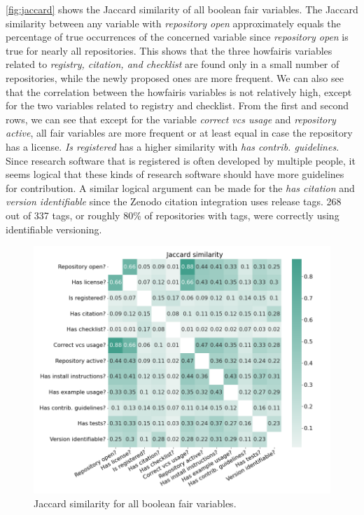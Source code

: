 \autoref{fig:jaccard} shows the Jaccard similarity of all boolean \acrshort{fair} variables. The Jaccard similarity between any variable with \textit{repository open} approximately equals the percentage of true occurrences of the concerned variable since \textit{repository open} is true for nearly all repositories. This shows that the three howfairis variables related to \textit{registry, citation, and checklist} are found only in a small number of repositories, while the newly proposed ones are more frequent. We can also see that the correlation between the howfairis variables is not relatively high, except for the two variables related to registry and checklist.
From the first and second rows, we can see that except for the variable \textit{correct vcs usage} and \textit{repository active}, all \acrshort{fair} variables are more frequent or at least equal in case the repository has a license. \textit{Is registered} has a higher similarity with \textit{has contrib. guidelines}. Since research software that is registered is often developed by multiple people, it seems logical that these kinds of research software should have more guidelines for contribution. A similar logical argument can be made for the \textit{has citation} and \textit{version identifiable} since the Zenodo citation integration uses release tags. 268 out of 337 tags, or roughly 80\% of repositories with tags, were correctly using identifiable versioning. 

\begin{figure}[h!]
\centerline{
\includegraphics[scale=0.5]{figures_results/heatmap_jaccard_similarity.png}}
\caption{Jaccard similarity for all boolean \acrshort{fair} variables.
\label{fig:jaccard}}
\end{figure}

